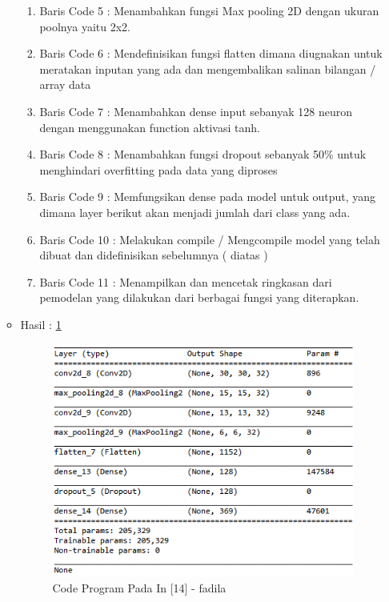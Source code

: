 \begin{enumerate}
\begin{itemize}
\begin{enumerate}
\item Baris Code 5	: Menambahkan fungsi Max pooling 2D dengan ukuran poolnya yaitu 2x2.
\item Baris Code 6	: Mendefinisikan fungsi flatten dimana diugnakan untuk meratakan inputan yang ada dan mengembalikan salinan bilangan / array data
\item Baris Code 7	: Menambahkan dense input sebanyak 128 neuron dengan menggunakan function aktivasi tanh.
\item Baris Code 8	: Menambahkan fungsi dropout sebanyak 50\% untuk menghindari overfitting pada data yang diproses
\item Baris Code 9	: Memfungsikan dense pada model untuk output, yang dimana layer berikut akan menjadi jumlah dari class yang ada.
\item Baris Code 10	: Melakukan compile / Mengcompile model yang telah dibuat dan didefinisikan sebelumnya ( diatas )
\item Baris Code 11	: Menampilkan dan mencetak ringkasan dari pemodelan yang dilakukan dari berbagai fungsi yang diterapkan.
\end{enumerate}
\par
\par
\item Hasil : \ref{chapter-7-in-14-fadila}
\par
\par
\begin{figure}[!hbtp]
\centering
\includegraphics[scale=0.4]{figures/chapter-7-in-14-fadila.png}
\caption{Code Program Pada In [14] - fadila}
\label{chapter-7-in-14-fadila}
\end{figure}
\par

\end{itemize}
\end{enumerate}
